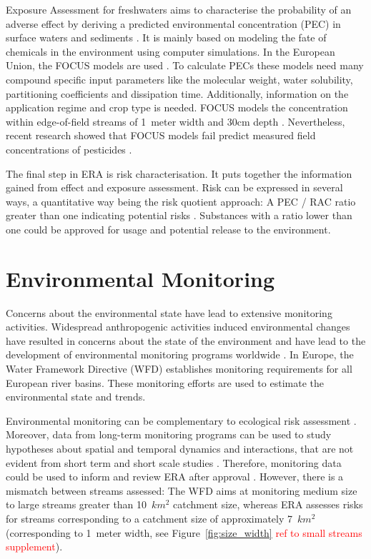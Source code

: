Exposure Assessment for freshwaters aims to characterise the probability of an adverse effect by deriving a predicted environmental concentration (PEC) in surface waters and sediments \citep{newman_fundamentals_2015}. 
It is mainly based on modeling the fate of chemicals in the environment using computer simulations. 
In the European Union, the FOCUS models are used \citep{focus_focus_2001, efsa_guidance_2013}.
To calculate PECs these models need many compound specific input parameters like the molecular weight, water solubility, partitioning coefficients and dissipation time. 
Additionally, information on the application regime and crop type is needed. 
FOCUS models the concentration within edge-of-field streams of 1~meter width and 30cm depth \citep{erlacher_regulation_2011}. 
Nevertheless, recent research showed that FOCUS models fail predict measured field concentrations of pesticides \citep{knabel_regulatory_2012, knabel_fungicide_2014}. 

The final step in ERA is risk characterisation.
It puts together the information gained from effect and exposure assessment. 
Risk can be expressed in several ways, a quantitative way being the risk quotient approach: A PEC / RAC ratio greater than one indicating potential risks \citep{efsa_guidance_2013, suter_ecological_2007, amiard-triquet_aquatic_2015}. 
Substances with a ratio lower than one could be approved for usage and potential release to the environment.



\section{Environmental Monitoring}

Concerns about the environmental state have lead to extensive monitoring activities. 
Widespread anthropogenic activities induced environmental changes have resulted in concerns about the state of the environment and have lead to the development of environmental monitoring programs worldwide \citep{nichols_monitoring_2006}. 
In Europe, the Water Framework Directive (WFD) \citep{european_union_directive_2000} establishes monitoring requirements for all European river basins. 
These monitoring efforts are used to estimate the environmental state and trends. 

Environmental monitoring can be complementary to ecological risk assessment \citep{suter_ecological_2007}.
Moreover, data from long-term monitoring programs can be used to study hypotheses about spatial and temporal dynamics and interactions, that are not evident from short term and short scale studies \citep{gitzen_design_2012}.
Therefore, monitoring data could be used to inform and review ERA after approval \citep{knauer_pesticides_2016}. 
However, there is a mismatch between streams assessed: The WFD aims at monitoring medium size to large streams greater than 10~$km^2$ catchment size, whereas ERA assesses risks for streams corresponding to a catchment size of approximately 7~$km^2$ (corresponding to 1~meter width, see Figure~\ref{fig:size_width} \textcolor{red}{ref to small streams supplement}). 


